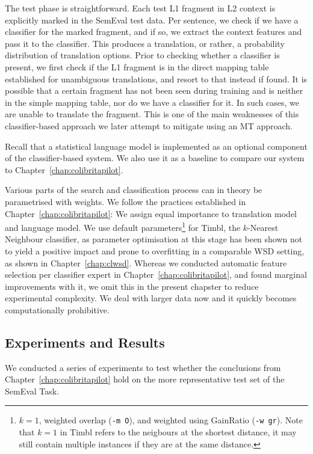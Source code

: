 The test phase is straightforward. Each test L1 fragment in L2 context
is explicitly marked in the SemEval test data. Per sentence, we check
if we have a classifier for the marked fragment, and if so, we extract
the context features and pass it to the classifier. This produces a
translation, or rather, a probability distribution of translation
options. Prior to checking whether a classifier is present, we first
check if the L1 fragment is in the direct mapping table established
for unambiguous translations, and resort to that instead if found. It
is possible that a certain fragment has not been seen during training
and is neither in the simple mapping table, nor do we have a
classifier for it. In such cases, we are unable to translate the
fragment. This is one of the main weaknesses of this classifier-based
approach we later attempt to mitigate using an MT approach.

Recall that a statistical language model is implemented as an optional component
of the classifier-based system. We also use it as a baseline to compare our
system to Chapter~\ref{chap:colibritapilot}.

Various parts of the search and classification process can in theory be
parametrised with weights. We follow the practices established in
Chapter~\ref{chap:colibritapilot}: We assign equal importance to translation
model and language model. We use default parameters\footnote{$k=1$, weighted
    overlap (\texttt{-m O}), and weighted using GainRatio (\texttt{-w gr}).
Note that $k=1$ in Timbl refers to the neigbours at the shortest distance, it
may still contain multiple instances if they are at the same distance.} for
Timbl, the $k$-Nearest Neighbour classifier, as parameter optimisation at this
stage has been shown not to yield a positive impact and prone to overfitting in
a comparable WSD setting, as shown in Chapter~\ref{chap:clwsd}. Whereas we
conducted automatic feature selection per classifier expert in
Chapter~\ref{chap:colibritapilot}, and found marginal
improvements with it, we omit this in the present chapster to reduce
experimental complexity. We deal with larger data now and it quickly becomes
computationally prohibitive.

\subsection{Experiments and Results}

We conducted a series of experiments to test whether the conclusions from
Chapter~\ref{chap:colibritapilot} hold on the more representative test set of
the SemEval Task. 

